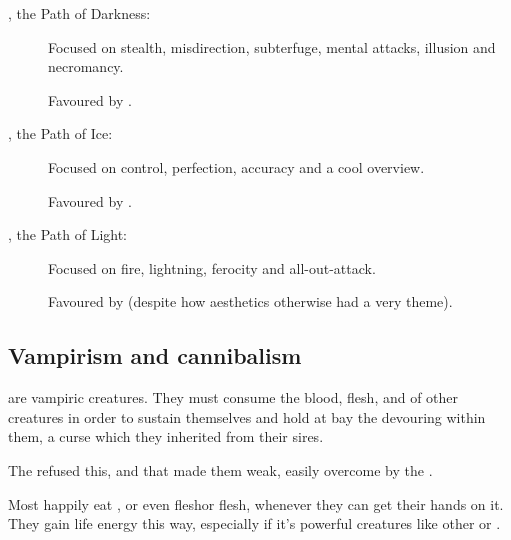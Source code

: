 \begin{description}
  \item[\Rumicor, the Path of Darkness:]
    Focused on stealth, misdirection, subterfuge, mental attacks, illusion and necromancy. 
    
    Favoured by \TiphredSerah. 
    
    
    
  \item[\Eshethicor, the Path of Ice:]
    Focused on control, perfection, accuracy and a cool overview. 
    
    Favoured by \CiriathSepher. 
    
    
    
  \item[\Shabacora, the Path of Light:]
    Focused on fire, lightning, ferocity and all-out-attack. 
    
    Favoured by \Mystraacht{} (despite how \Mystraacht{} aesthetics otherwise had a very  theme).
\end{description}










\subsection{Vampirism and cannibalism}
\Resphain{} are vampiric creatures. They must consume the blood, flesh,  and  of other creatures in order to sustain themselves and hold at bay the devouring  within them, a curse which they inherited from their \SitraAchra sires.

The  refused this, and that made them weak, easily overcome by the . 

Most \Resphain{} happily eat \human, \scatha{} or even \resphan{} flesh\dash or \dragon{} flesh, whenever they can get their hands on it. They gain life energy this way, especially if it's powerful creatures like other \resphain{} or \dragons. 

